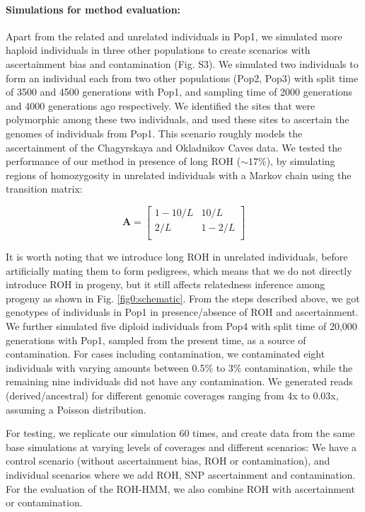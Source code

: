 \documentclass[12pt, letterpaper]{article}
\begin{document}
\paragraph{Simulations for method evaluation:}
Apart from the related and unrelated individuals in Pop1, we simulated more haploid individuals in three other populations to create scenarios with ascertainment bias and contamination (Fig. S3). We simulated two individuals to form an individual each from two other populations (Pop2, Pop3) with split time of 3500 and 4500 generations with Pop1, and sampling time of 2000 generations and 4000 generations ago respectively.  We identified the sites that were polymorphic among these two individuals, and used these sites to ascertain the genomes of individuals from Pop1. This scenario roughly models the ascertainment of the Chagyrskaya and Okladnikov Caves data. We tested the performance of our method in presence of long ROH ($\sim17\%$), by simulating regions of homozygosity in unrelated individuals with a Markov chain using the transition matrix:

$$\mathbf{A} = \left[\begin{array}
{rr}
1-10/L & 10/L \\
2/L & 1-2/L  \\
\end{array}\right]
$$

It is worth noting that we introduce long ROH in unrelated individuals, before artificially mating them to form pedigrees, which means that we do not directly introduce ROH in progeny, but it still affects relatedness inference among progeny as shown in Fig. \ref{fig0:schematic}.
From the steps described above, we got genotypes of individuals in Pop1 in presence/absence of ROH and ascertainment. We further simulated five diploid individuals from Pop4 with split time of 20,000 generations with Pop1, sampled from the present time, as a source of contamination.  For cases including contamination, we contaminated eight individuals with varying amounts between 0.5\% to 3\% contamination, while the remaining  nine individuals did not have any contamination. We generated reads (derived/ancestral) for different genomic coverages ranging from 4x to 0.03x, assuming a Poisson distribution.

For testing, we replicate our simulation 60 times, and create data from the same base simulations at varying levels of coverages and different scenarios: We have a control scenario (without ascertainment bias, ROH or contamination), and individual scenarios where we add ROH, SNP ascertainment and contamination. For the evaluation of the ROH-HMM, we also combine ROH with ascertainment or contamination.
\end{document}
